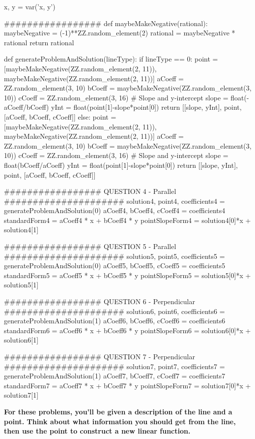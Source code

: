 \documentclass{ximera}
\begin{document}
\begin{sagesilent}
x, y = var('x, y')

#################
def maybeMakeNegative(rational):
    maybeNegative = (-1)**ZZ.random_element(2)
    rational = maybeNegative * rational
    return rational

def generateProblemAndSolution(lineType):
    if lineType == 0:
        point = [maybeMakeNegative(ZZ.random_element(2, 11)), maybeMakeNegative(ZZ.random_element(2, 11))]
        aCoeff = ZZ.random_element(3, 10)
        bCoeff = maybeMakeNegative(ZZ.random_element(3, 10))
        cCoeff = ZZ.random_element(3, 16)
        # Slope and y-intercept
        slope = float(-aCoeff/bCoeff)
        yInt = float(point[1]-slope*point[0])
        return [[slope, yInt], point, [aCoeff, bCoeff, cCoeff]]
    else:
        point = [maybeMakeNegative(ZZ.random_element(2, 11)), maybeMakeNegative(ZZ.random_element(2, 11))]
        aCoeff = ZZ.random_element(3, 10)
        bCoeff = maybeMakeNegative(ZZ.random_element(3, 10))
        cCoeff = ZZ.random_element(3, 16)
        # Slope and y-intercept
        slope = float(bCoeff/aCoeff)
        yInt = float(point[1]-slope*point[0])
        return [[slope, yInt], point, [aCoeff, bCoeff, cCoeff]]

################# QUESTION 4 - Parallel #####################
solution4, point4, coefficients4 = generateProblemAndSolution(0)
aCoeff4, bCoeff4, cCoeff4 = coefficients4
standardForm4 = aCoeff4 * x + bCoeff4 * y
pointSlopeForm4 = solution4[0]*x + solution4[1]

################# QUESTION 5 - Parallel #####################
solution5, point5, coefficients5 = generateProblemAndSolution(0)
aCoeff5, bCoeff5, cCoeff5 = coefficients5
standardForm5 = aCoeff5 * x + bCoeff5 * y
pointSlopeForm5 = solution5[0]*x + solution5[1]

################# QUESTION 6 - Perpendicular #####################
solution6, point6, coefficients6 = generateProblemAndSolution(1)
aCoeff6, bCoeff6, cCoeff6 = coefficients6
standardForm6 = aCoeff6 * x + bCoeff6 * y
pointSlopeForm6 = solution6[0]*x + solution6[1]

################# QUESTION 7 - Perpendicular #####################
solution7, point7, coefficients7 = generateProblemAndSolution(1)
aCoeff7, bCoeff7, cCoeff7 = coefficients7
standardForm7 = aCoeff7 * x + bCoeff7 * y
pointSlopeForm7 = solution7[0]*x + solution7[1]
\end{sagesilent}

\textbf{For these problems, you'll be given a description of the line and a point. Think about what information you should get from the line, then use the point to construct a new linear function.}
\end{document}
